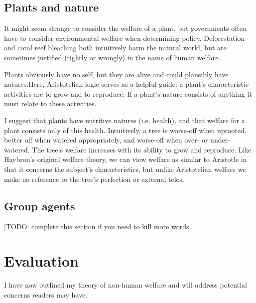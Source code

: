 \documentclass{article}
\begin{document}
\subsection{Plants and nature}

It might seem strange to consider the welfare of a plant, but governments often have to consider environmental welfare when determining policy. Deforestation and coral reef bleaching both intuitively harm the natural world, but are sometimes justified (rightly or wrongly) in the name of human welfare. 

Plants obviously have no self, but they are alive and could plausibly have natures.Here, Aristotelian logic serves as a helpful guide: a plant's characteristic activities are to grow and to reproduce. If a plant's nature consists of anything it must relate to these activities. 

I suggest that plants have nutritive natures (i.e. health), and that welfare for a plant consists only of this health. Intuitively, a tree is worse-off when uprooted, better off when watered appropriately, and worse-off when over- or under-watered. The tree's welfare increases with its ability to grow and reproduce. Like Haybron's original welfare theory, we can view welfare as similar to Aristotle in that it concerns the subject's characteristics, but unlike Aristotelian welfare we make no reference to the tree's perfection or external telos.

\subsection{Group agents}

[TODO: complete this section if you need to kill more words]

\section{Evaluation}

I have now outlined my theory of non-human welfare and will address potential concerns readers may have.





\end{document}
